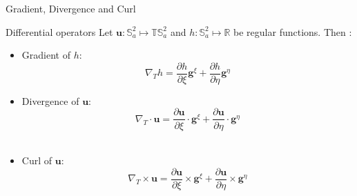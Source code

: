 \documentclass[11pt]{beamer}
\begin{document}


\begin{frame}{Gradient, Divergence and Curl}

\begin{block}{Differential operators}
Let $\mathbf{u} : \mathbb{S}_a^2 \mapsto \mathbb{T}\mathbb{S}_a^2$ and $h : \mathbb{S}_a^2 \mapsto \mathbb{R}$ be regular functions. Then :
\begin{itemize}
\item Gradient of $h$:
\begin{equation}
\nabla_T h = \dfrac{\partial h}{\partial \xi} \mathbf{g}^{\xi} + \dfrac{\partial h}{\partial \eta} \mathbf{g}^{\eta}
\end{equation}
\item Divergence of $\mathbf{u}$:
\begin{equation}
\nabla_T \cdot \mathbf{u} = \dfrac{\partial \mathbf{u}}{\partial \xi}\cdot \mathbf{g}^{\xi} + \dfrac{\partial \mathbf{u}}{\partial \eta} \cdot \mathbf{g}^{\eta}
\end{equation}\\
\item Curl of $\mathbf{u}$:
\begin{equation}
\nabla_T \times \mathbf{u} = \dfrac{\partial \mathbf{u}}{\partial \xi}\times \mathbf{g}^{\xi} + \dfrac{\partial \mathbf{u}}{\partial \eta} \times \mathbf{g}^{\eta}
\end{equation}

\end{itemize}

\end{block}
\end{frame}


%
\end{document}
